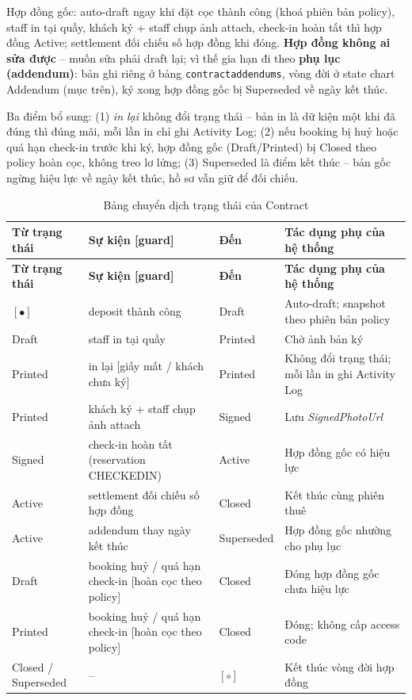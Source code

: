 \documentclass[12pt,a4paper]{article}
\newcommand{\entity}[1]{\texttt{#1}}
\newcommand{\attr}[1]{\textit{#1}}
\renewcommand{\_}{\textunderscore\allowbreak}
\begin{document}
Hợp đồng gốc: auto-draft ngay khi đặt cọc thành công (khoá phiên bản policy), staff in tại quầy, khách ký + staff chụp ảnh attach, check-in hoàn tất thì hợp đồng Active; settlement đối chiếu số hợp đồng khi đóng. \textbf{Hợp đồng không ai sửa được} -- muốn sửa phải draft lại; vì thế gia hạn đi theo \textbf{phụ lục (addendum)}: bản ghi riêng ở bảng \entity{contract\_addendums}, vòng đời ở state chart Addendum (mục trên), ký xong hợp đồng gốc bị Superseded về ngày kết thúc.

Ba điểm bổ sung: (1) \textit{in lại} không đổi trạng thái -- bản in là dữ kiện một khi đã đúng thì đúng mãi, mỗi lần in chỉ ghi Activity Log; (2) nếu booking bị huỷ hoặc quá hạn check-in trước khi ký, hợp đồng gốc (Draft/Printed) bị Closed theo policy hoàn cọc, không treo lơ lửng; (3) Superseded là điểm kết thúc -- bản gốc ngừng hiệu lực về ngày kết thúc, hồ sơ vẫn giữ để đối chiếu.

\begin{xltabular}{\textwidth}{|p{2.6cm}|p{4.4cm}|p{2.6cm}|X|}
\caption{Bảng chuyển dịch trạng thái của Contract} \\
\hline
\textbf{Từ trạng thái} & \textbf{Sự kiện [guard]} & \textbf{Đến} & \textbf{Tác dụng phụ của hệ thống} \\ \hline
\endfirsthead
\hline
\textbf{Từ trạng thái} & \textbf{Sự kiện [guard]} & \textbf{Đến} & \textbf{Tác dụng phụ của hệ thống} \\ \hline
\endhead
$[\bullet]$ & deposit thành công & Draft & Auto-draft; snapshot theo phiên bản policy \\ \hline
Draft & staff in tại quầy & Printed & Chờ ảnh bản ký \\ \hline
Printed & in lại [giấy mất / khách chưa ký] & Printed & Không đổi trạng thái; mỗi lần in ghi Activity Log \\ \hline
Printed & khách ký + staff chụp ảnh attach & Signed & Lưu \attr{SignedPhotoUrl} \\ \hline
Signed & check-in hoàn tất (reservation CHECKED\_IN) & Active & Hợp đồng gốc có hiệu lực \\ \hline
Active & settlement đối chiếu số hợp đồng & Closed & Kết thúc cùng phiên thuê \\ \hline
Active & addendum thay ngày kết thúc & Superseded & Hợp đồng gốc nhường cho phụ lục \\ \hline
Draft & booking huỷ / quá hạn check-in [hoàn cọc theo policy] & Closed & Đóng hợp đồng gốc chưa hiệu lực \\ \hline
Printed & booking huỷ / quá hạn check-in [hoàn cọc theo policy] & Closed & Đóng; không cấp access code \\ \hline
Closed / Superseded & -- & $[\circ]$ & Kết thúc vòng đời hợp đồng \\ \hline
\end{xltabular}
\end{document}
